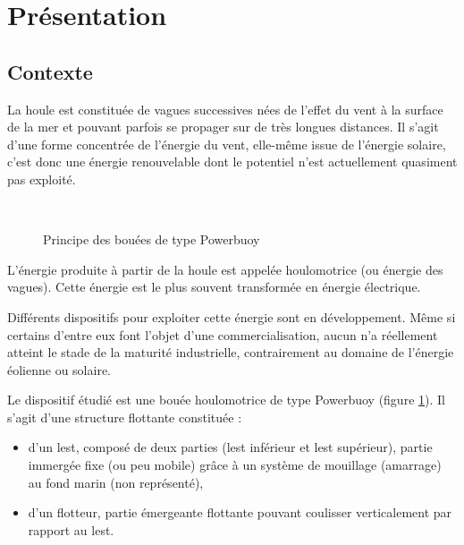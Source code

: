 

\section{Présentation}

\subsection{Contexte}

La houle est constituée de vagues successives nées de l'effet du vent à la surface de la mer et pouvant parfois se propager sur de très longues distances. Il s'agit d'une forme concentrée de l'énergie du vent, elle-même issue de l'énergie solaire, c'est donc une énergie renouvelable dont le potentiel n'est actuellement quasiment pas exploité.

~\

\begin{figure}
	\vspace{-0.8cm}
\begin{center}
  \def\svgwidth{0.8\linewidth}
  
 \end{center}
  \caption{Principe des bouées de type \og Powerbuoy \fg}
\label{fig01}
\end{figure}

L'énergie produite à partir de la houle est appelée houlomotrice (ou énergie des vagues). Cette énergie est le plus souvent transformée en énergie électrique.

Différents dispositifs pour exploiter cette énergie sont en développement. Même si certains d'entre eux font l'objet d'une commercialisation, aucun n'a réellement atteint le stade de la maturité industrielle, contrairement au domaine de l'énergie éolienne ou solaire.

Le dispositif étudié est une bouée houlomotrice de type \og Powerbuoy \fg (figure \ref{fig01}). Il s'agit d'une structure flottante constituée :

\begin{itemize}
 \item d'un lest, composé de deux parties (lest inférieur et lest supérieur), partie immergée fixe (ou peu mobile) grâce à un système de mouillage (amarrage) au fond marin (non représenté),
 \item d'un flotteur, partie émergeante flottante pouvant coulisser verticalement par rapport au lest.
\end{itemize}


